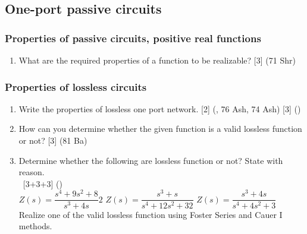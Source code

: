 \documentclass[12pt]{article}
\newcommand{\enter}{\\\textcolor{white}{1}}
\begin{document}
\subsection{One-port passive circuits}
\subsubsection{Properties of passive circuits, positive real functions}
	\begin{enumerate}[noitemsep, topsep=0pt]
		\item What are the required properties of a function to be realizable? \hfill [3] (71 Shr)
	\end{enumerate}
\subsubsection{Properties of lossless circuits}
\begin{enumerate}[noitemsep, topsep=0pt]
	\item Write the properties of lossless one port network. \hfill [2] (, 76 Ash, 74 Ash) [3] ()
	
	\item How can you determine whether the given function is a valid lossless function or not? \hfill [3] (81 Ba)
	
	\item Determine whether the following are lossless function or not? State with reason. 
	\enter\hfill [3+3+3] ()\\
	$Z(s) = \dfrac{s^4+9s^2+8}{s^3+4s}2$ \hspace{1cm}
	$Z(s) = \dfrac{s^3+s}{s^4+12s^2+32}$ \hspace{1cm}
	$Z(s) = \dfrac{s^3+4s}{s^4+4s^2+3}$\\
	Realize one of the valid lossless function using Foster Series and Cauer I methods.
\end{enumerate}
\end{document}
